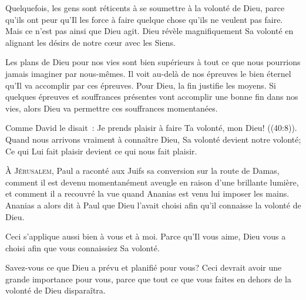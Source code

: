 
Quelquefois, les gens sont réticents à se soumettre à la volonté de Dieu,
 parce qu'ils ont peur qu'Il les force à faire quelque chose
 qu'ils ne veulent pas faire. Mais ce n'est pas ainsi que Dieu agit.
 Dieu révèle magnifiquement Sa volonté en alignant les désirs de notre
 c\oe{}ur avec les Siens.

Les plans de Dieu pour nos vies sont bien supérieurs à tout
 ce que nous pourrions jamais imaginer par nous-mêmes.
 Il voit au-delà de nos épreuves le bien éternel qu'Il va accomplir
 par ces épreuves. Pour Dieu, la fin justifie les moyens.
 Si quelques épreuves et souffrances présentes vont accomplir
 une bonne fin dans nos vies, alors Dieu va permettre
 ces souffrances momentanées.

Comme David le disait~: 
 \og Je prends plaisir à faire Ta volonté, mon Dieu! \fg{}
 ((40:8)). Quand nous arrivons vraiment à connaître Dieu,
 Sa volonté devient notre volonté; Ce qui Lui fait plaisir
 devient ce qui nous fait plaisir.

\dvrule






\lettrine{À}{ Jérusalem}, Paul a raconté aux Juifs sa conversion
 sur la route de Damas, comment il est devenu momentanément aveugle
 en raison d'une brillante lumière, et comment il a recouvré la vue
 quand Ananias est venu lui imposer les mains.
 Ananias a alors dit à Paul que Dieu l'avait choisi afin qu'il connaisse
 la volonté de Dieu.

Ceci s'applique aussi bien à vous et à moi.
 Parce qu'Il vous aime, Dieu vous a choisi afin que vous connaissiez Sa volonté.

Savez-vous ce que Dieu a prévu et planifié pour vous?
 Ceci devrait avoir une grande importance pour vous,
 parce que tout ce que vous faites en dehors de la volonté de Dieu disparaîtra.

